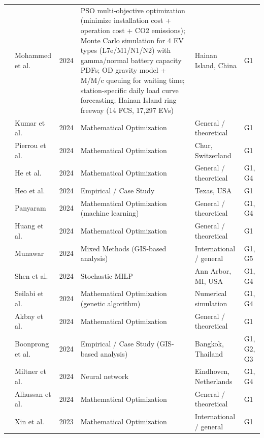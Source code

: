 \documentclass[letterpaper, 12pt, oneside, doublespacing]{Thesis}
\begin{document}
\begin{longtable}{L{0.9cm} L{2.2cm} L{0.8cm} L{3.3cm} L{2.5cm} L{1.5cm}}
\cite{multiobjective_optimization_2024} & Mohammed et al. & 2024 & PSO multi-objective optimization (minimize installation cost + operation cost + CO2 emissions); Monte Carlo simulation for 4 EV types (L7e/M1/N1/N2) with gamma/normal battery capacity PDFs; OD gravity model + M/M/c queuing for waiting time; station-specific daily load curve forecasting; Hainan Island ring freeway (14 FCS, 17,297 EVs) & Hainan Island, China & G1 \\
\cite{optimal_electric_2024} & Kumar et al. & 2024 & Mathematical Optimization & General {\slash} theoretical & G1 \\
\cite{optimal_ev_2024} & Pierrou et al. & 2024 & Mathematical Optimization & Chur, Switzerland & G1 \\
\cite{optimal_evcs_2024} & He et al. & 2024 & Mathematical Optimization & General {\slash} theoretical & G1, G4 \\
\cite{optimal_planning_2024} & Heo et al. & 2024 & Empirical / Case Study & Texas, USA & G1 \\
\cite{optimization_strategies_2024} & Panyaram & 2024 & Mathematical Optimization (machine learning) & General {\slash} theoretical & G1, G4 \\
\cite{optimizing_ev_2024} & Huang et al. & 2024 & Mathematical Optimization & General {\slash} theoretical & G1 \\
\cite{optimizing_urban_2024} & Munawar & 2024 & Mixed Methods (GIS-based analysis) & International {\slash} general & G1, G5 \\
\cite{sequential_charging_2024} & Shen et al. & 2024 & Stochastic MILP & Ann Arbor, MI, USA & G1, G4 \\
\cite{sustainable_planning_2024} & Seilabi et al. & 2024 & Mathematical Optimization (genetic algorithm) & Numerical simulation & G1, G4 \\
\cite{the_electric_2024} & Akbay et al. & 2024 & Mathematical Optimization & General {\slash} theoretical & G1 \\
\cite{towards_sustainable_2024} & Boonprong et al. & 2024 & Empirical / Case Study (GIS-based analysis) & Bangkok, Thailand & G1, G2, G3 \\
\cite{towards_using_2024} & Miltner et al. & 2024 & Neural network & Eindhoven, Netherlands & G1, G4 \\
\cite{urban_electric_2024} & Alhussan et al. & 2024 & Mathematical Optimization & General {\slash} theoretical & G1 \\
\cite{a_battery_2023} & Xin et al. & 2023 & Mathematical Optimization & International {\slash} general & G1 \\

\end{longtable}
\end{document}

